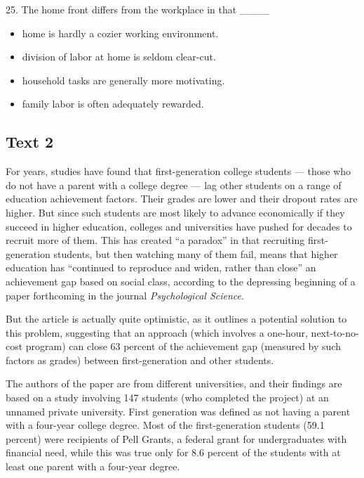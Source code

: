 \documentclass[UTF8,11pt]{ctexart}
\begin{document}
25. The home front differs from the workplace in that \_\_\_\_


\begin{itemize}[leftmargin=2em,itemsep=.2em,topsep=.4em]\item[A.] home is hardly a cozier working environment.
\item[B.] division of labor at home is seldom clear-cut.
\item[C.] household tasks are generally more motivating.
\item[D.] family labor is often adequately rewarded.
\end{itemize}

\subsection*{\textbf{Text 2}}


For years, studies have found that first-generation college students — those who do not have a parent with a college degree — lag other students on a range of education achievement factors. Their grades are lower and their dropout rates are higher. But since such students are most likely to advance economically if they succeed in higher education, colleges and universities have pushed for decades to recruit more of them. This has created “a paradox” in that recruiting first-generation students, but then watching many of them fail, means that higher education has “continued to reproduce and widen, rather than close” an achievement gap based on social class, according to the depressing beginning of a paper forthcoming in the journal \textit{Psychological Science}.


But the article is actually quite optimistic, as it outlines a potential solution to this problem, suggesting that an approach (which involves a one-hour, next-to-no-cost program) can close 63 percent of the achievement gap (measured by such factors as grades) between first-generation and other students.


The authors of the paper are from different universities, and their findings are based on a study involving 147 students (who completed the project) at an unnamed private university. First generation was defined as not having a parent with a four-year college degree. Most of the first-generation students (59.1 percent) were recipients of Pell Grants, a federal grant for undergraduates with financial need, while this was true only for 8.6 percent of the students with at least one parent with a four-year degree.
\end{document}

